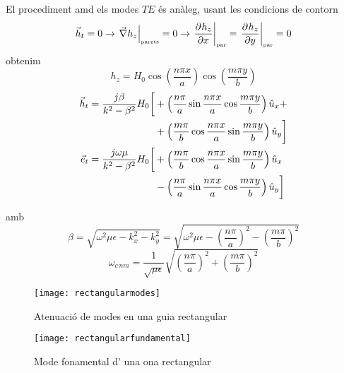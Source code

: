 El procediment amd els modes $TE$ és anàleg, usant les condicions de contorn
\begin{equation}
  \vec h_t = 0 \to \left. \vec \nabla h_z \right \vert _{\text{\tiny parets}} = 0 \to \left. \frac{\partial ^{} h_z}{\partial x ^{}}  \right \vert _{\text{\tiny par}} =  \left. \frac{\partial ^{} h_z}{\partial y ^{}}  \right \vert _{\text{\tiny par}} = 0
\end{equation}
obtenim
\begin{equation}
  h_z = H_0 \cos \left ( \frac{n \pi x}{a} \right ) \cos \left ( \frac{m \pi y}{b} \right )
\end{equation}
\begin{subequations}
\begin{align}
  \vec h_t = \frac{  j \beta }{k^ 2 - \beta ^ 2} H_0
  \bigg [
    &+\left (\frac{n \pi}{a} \sin \frac{n \pi x}{a} \cos \frac{m \pi y}{b} \right ) \hat u_x + \nonumber \\
    &+\left ( \frac{m \pi }{b} \cos \frac{n \pi x}{a} \sin \frac{m \pi y}{b} \right ) \hat u_y
  \bigg ] \\
  \vec e _ t = \frac{  j \omega \mu }{k^ 2 - \beta ^ 2} H_0
  \bigg [
    &+\left (\frac{m \pi}{b} \cos \frac{n \pi x}{a} \sin \frac{m \pi y}{b} \right ) \hat u_x \nonumber \\
   &-\left ( \frac{n \pi }{a} \sin \frac{n \pi x}{a} \cos \frac{m \pi y}{b} \right ) \hat u_y 
  \bigg ]
\end{align}
\end{subequations}

amb
\begin{equation}
  \beta = \sqrt{ \omega ^2 \mu \epsilon - k_x ^2 - k_y ^ 2 } = \sqrt{\omega^2 \mu \epsilon - \left (\frac{n \pi}{a} \right ) ^2  - \left ( \frac{m \pi}{b} \right) ^2 }
\end{equation}
\begin{equation}
  \omega _{c \,nm} =  \frac{1}{\sqrt{\mu \epsilon}} \sqrt{   \left (\frac{n \pi}{a} \right ) ^2 + \left ( \frac{m \pi}{b} \right) ^2}
\end{equation}

\begin{figure}[ht]
\begin{minipage}{8cm}
  \centering
  \texttt{[image: rectangularmodes]}
  \caption{Atenuació de modes en una guia rectangular}
  \vspace{-1 em}
\end{minipage}
\begin{minipage}{8cm}
  \centering
  \texttt{[image: rectangularfundamental]}
  \caption{Mode fonamental d' una ona rectangular}
  \label{rectangularfundamental}
  \vspace{-1 em}
\end{minipage}
\end{figure}

